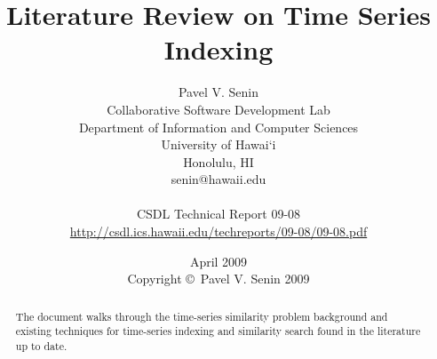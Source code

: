 \documentclass[11pt,oneside]{report}
\numberwithin{equation}{subsection}
\begin{document}
\title{Literature Review on Time Series Indexing}
\author{Pavel V. Senin \\
Collaborative Software Development Lab \\
Department of Information and Computer Sciences \\
University of Hawai`i \\
Honolulu, HI \\
senin@hawaii.edu \\
\\
CSDL Technical Report 09-08 \\
\url{http://csdl.ics.hawaii.edu/techreports/09-08/09-08.pdf}
}
\date{April 2009\\[3pt]
Copyright \copyright\ Pavel V. Senin 2009}

\maketitle

\tableofcontents

\begin{abstract}
The document walks through the time-series similarity problem background and existing techniques for time-series indexing and similarity search found in the literature up to date.
\end{abstract}



















%
%
\end{document}
